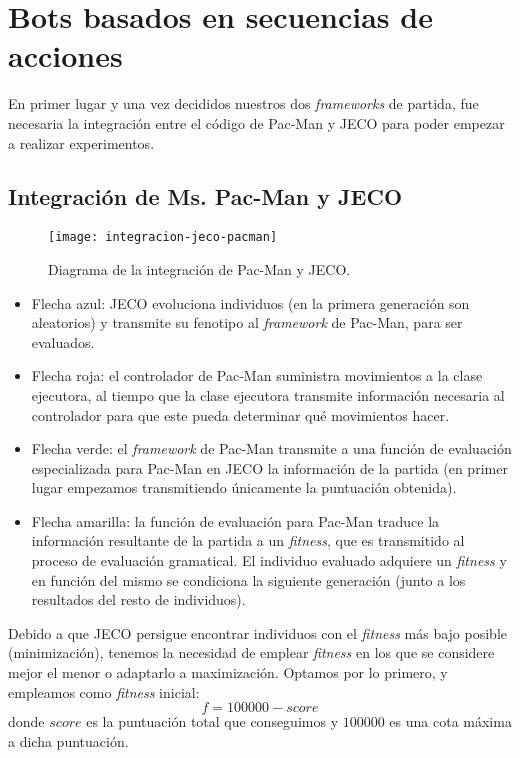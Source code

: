 \chapter{Bots basados en secuencias de acciones} \label{cap:bots-secuencia-acciones}
En primer lugar y una vez decididos nuestros dos \textit{frameworks} de partida, fue necesaria la integración entre el código de Pac-Man y JECO para poder empezar a realizar experimentos.

\section{Integración de Ms. Pac-Man y JECO}
\begin{figure}[H]
\centering
\texttt{[image: integracion-jeco-pacman]}
\caption{Diagrama de la integración de Pac-Man y JECO.}
\end{figure}
\begin{itemize}
\item Flecha azul: JECO evoluciona individuos (en la primera generación son aleatorios) y transmite su fenotipo al \textit{framework} de Pac-Man, para ser evaluados.

\item Flecha roja: el controlador de Pac-Man suministra movimientos a la clase ejecutora, al tiempo que la clase ejecutora transmite información necesaria al controlador para que este pueda determinar qué movimientos hacer.

\item Flecha verde: el \textit{framework} de Pac-Man transmite a una función de evaluación especializada para Pac-Man en JECO la información de la partida (en primer lugar empezamos transmitiendo únicamente la puntuación obtenida).

\item Flecha amarilla: la función de evaluación para Pac-Man traduce la información resultante de la partida a un \textit{fitness}, que es transmitido al proceso de evaluación gramatical. El individuo evaluado adquiere un \textit{fitness} y en función del mismo se condiciona la siguiente generación (junto a los resultados del resto de individuos).
\end{itemize}

Debido a que JECO persigue encontrar individuos con el \textit{fitness} más bajo posible (minimización), tenemos la necesidad de emplear \textit{fitness} en los que se considere mejor el menor o adaptarlo a maximización. Optamos por lo primero, y empleamos como \textit{fitness} inicial:
\begin{equation*}
f = 100000 - score
\end{equation*}
donde $score$ es la puntuación total que conseguimos y $100000$ es una cota máxima a dicha puntuación.



